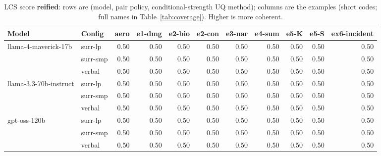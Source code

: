 \documentclass[11pt]{article}
\begin{document}
\begin{table}[htbp]
\centering
\footnotesize
\setlength{\tabcolsep}{3.5pt}
\caption{LCS score \textbf{reified}: rows are (model, pair policy, conditional-strength UQ method); columns are the examples (short codes; full names in Table~\ref{tab:coverage}). Higher is more coherent.}
\label{tab:reified}
\begin{tabular}{llrrrrrrrrr}
\toprule
\textbf{Model} & \textbf{Config} & \textbf{aero} & \textbf{e1-dmg} & \textbf{e2-bio} & \textbf{e2-con} & \textbf{e3-nar} & \textbf{e4-sum} & \textbf{e5-K} & \textbf{e5-S} & \textbf{ex6-incident} \\
\midrule
llama-4-maverick-17b & surr-lp & 0.50 & 0.50 & 0.50 & 0.50 & 0.50 & 0.50 & 0.50 & 0.50 & 0.50 \\
 & surr-smp & 0.50 & 0.50 & 0.50 & 0.50 & 0.50 & 0.50 & 0.50 & 0.50 & 0.50 \\
 & verbal & 0.50 & 0.50 & 0.50 & 0.50 & 0.50 & 0.50 & 0.50 & 0.50 & 0.50 \\
\midrule
llama-3.3-70b-instruct & surr-lp & 0.50 & 0.50 & 0.50 & 0.50 & 0.50 & 0.50 & 0.50 & 0.50 & 0.50 \\
 & surr-smp & 0.50 & 0.50 & 0.50 & 0.50 & 0.50 & 0.50 & 0.50 & 0.50 & 0.50 \\
 & verbal & 0.50 & 0.50 & 0.50 & 0.50 & 0.50 & 0.50 & 0.50 & 0.50 & 0.50 \\
\midrule
gpt-oss-120b & surr-lp & 0.50 & 0.50 & 0.50 & 0.50 & 0.50 & 0.50 & 0.50 & 0.50 & 0.50 \\
 & surr-smp & 0.50 & 0.50 & 0.50 & 0.50 & 0.50 & 0.50 & 0.50 & 0.50 & 0.50 \\
 & verbal & 0.50 & 0.50 & 0.50 & 0.50 & 0.50 & 0.50 & 0.50 & 0.50 & 0.50 \\
\bottomrule
\end{tabular}
\end{table}
\end{document}

